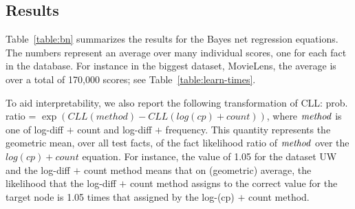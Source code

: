 \documentclass[twoside,11pt]{article}
\begin{document}
\subsection{Results} 

Table~\ref{table:bn} summarizes the results for the Bayes net regression equations. 
The numbers represent an average over many individual scores, one for each fact
in the database. 
For instance in the biggest dataset, MovieLens, the average is over a total of 170,000 scores; see Table~\ref{table:learn-times}. 

To aid interpretability, we also report the following transformation of CLL: prob. ratio = $\exp(CLL(method) - CLL(log(cp) + count))$,  where $\it{method}$ is one of log-diff $+$ count and log-diff $+$ frequency. This quantity represents the geometric mean, over all test facts, of the fact likelihood ratio of $\it{method}$  over the $log(cp) + count$ equation.
For instance, the value of 1.05 for the dataset UW and the log-diff $+$ count method means that on (geometric) average, the likelihood that the log-diff $+$ count method assigns to the correct value for the target node is 1.05 times that assigned by the log-(cp) $+$ count method.
\end{document}
